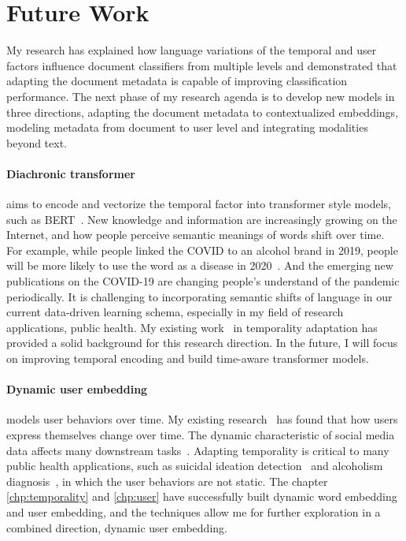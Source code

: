 \section{Future Work}

My research has explained how language variations of the temporal and user factors influence document classifiers from multiple levels and demonstrated that adapting the document metadata is capable of improving classification performance.
The next phase of my research agenda is to develop new models in three directions, adapting the document metadata to contextualized embeddings, modeling metadata from document to user level and integrating modalities beyond text.

\paragraph{Diachronic transformer}
aims to encode and vectorize the temporal factor into transformer style models, such as BERT~\cite{devlin2019bert}.
New knowledge and information are increasingly growing on the Internet, and how people perceive semantic meanings of words shift over time. 
For example, while people linked the COVID to an alcohol brand in 2019, people will be more likely to use the word as a disease in 2020~\cite{broniatowski2020covid}. 
And the emerging new publications on the COVID-19 are changing people's understand of the pandemic periodically.
It is challenging to incorporating semantic shifts of language in our current data-driven learning schema, especially in my field of research applications, public health. 
My existing work~\cite{huang2018examining, huang2018modeling, huang2019neural} in temporality adaptation has provided a solid background for this research direction.
In the future, I will focus on improving temporal encoding and build time-aware transformer models.


\paragraph{Dynamic user embedding}
models user behaviors over time. 
My existing research~\cite{huang2019neural} has found that how users express themselves change over time.
The dynamic characteristic of social media data affects many downstream tasks~\cite{pan2019social}. 
Adapting temporality is critical to many public health applications, such as suicidal ideation detection~\cite{huang2015topic, huang2017exploring} and alcoholism diagnosis~\cite{huang2018modeling}, in which the user behaviors are not static.
The chapter \ref{chp:temporality} and \ref{chp:user} have successfully built dynamic word embedding and user embedding, and the techniques allow me for further exploration in a combined direction, dynamic user embedding.

